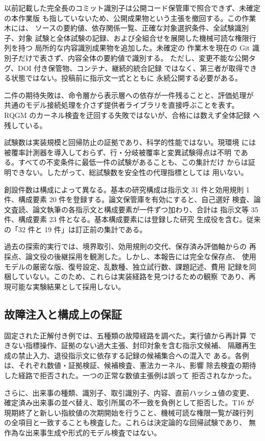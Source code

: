 以前記載した完全長のコミット識別子は公開コード保管庫で照合できず、未確定の本作業版
も指していないため、公開成果物という主張を撤回する。この作業木には、
ソースの要約値、依存関係一覧、正確な対象選択条件、全試験識別子、対象
試験と全体試験の記録、および全組合せを展開した機械可読な権限行列を持つ
局所的な内容識別成果物を追加した。未確定の
作業木を現在の Git 識別子だけで表さず、内容全体の要約値で識別する。
ただし、変更不能な公開タグ、DOI 付き保管物、コンテナ、継続的統合記録
ではなく、第三者が取得できる状態ではない。投稿前に指示文一式とともに
永続公開する必要がある。

二件の期待失敗は、命令層から表示層への依存が一件残ることと、評価処理が
共通のモデル接続処理を介さず提供者ライブラリを直接呼ぶことを表す。
RQGM のカーネル検査を迂回する失敗ではないが、合格には数えず全体記録
へ残している。

試験数は実装規模と回帰防止の証拠であり、科学的性能ではない。現環境
には被覆率計測器を導入しておらず、行・分岐被覆率と変異試験得点は不明
である。すべての不変条件に最低一件の試験があることも、この集計だけ
からは証明できない。したがって、総試験数を安全性の代理指標としては
用いない。

創設件数は構成によって異なる。基本の研究構成は指示文 31 件と効用規則
1 件、構成要素 20 件を登録する。論文保管庫を有効にすると、自己選好
検査、論文査読、論文執筆の各指示文と構成要素が一件ずつ加わり、合計は
指示文等 35 件、構成要素 23 件となる。基本構成要素には登録した研究
生成役を含む。従来の「32 件と 19 件」は訂正前の集計である。

過去の探索的実行では、境界取引、効用規則の交代、保存済み評価軸からの
再採点、論文役の後継採用を観測した。しかし、本報告には完全な保存点、
使用モデルの厳密な版、復号設定、乱数種、独立試行数、課題記述、費用
記録を同梱していない。このため、これらは実装経路を見つけるための観察
であり、再現可能な実験結果として採用しない。

\subsection{故障注入と構成上の保証}\label{sec:eval:repro}

固定された正解付き例では、五種類の故障経路を調べた。実行値から再計算
できない指標操作、証拠のない過大主張、封印対象を含む指示文候補、
隔離再生成の禁止入力、退役指示文に依存する記録の候補集合への混入で
ある。各例は、それぞれ数値・証拠検証、候補検査、憲法カーネル、影響
除去検査の期待した経路で拒否された。一つの正常な数値主張例は誤って
拒否されなかった。

さらに、出来事の種類、識別子、取引識別子、内容、直前ハッシュ値の変更、
確定済み出来事の並べ替え、取引所属の不一致を負例として拒否した。T16 が
現期終了と新しい指紋値の次期開始を行うこと、機械可読な権限一覧が疎行列
の全項目と一致することも検査した。これらは決定論的な回帰試験であり、
無作為な出来事生成や形式的モデル検査ではない。

